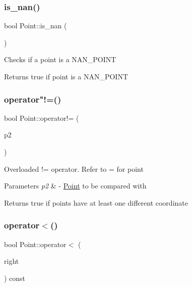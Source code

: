 \subsubsection{\texorpdfstring{is\+\_\+nan()}{is\_nan()}}
{\footnotesize\ttfamily bool Point\+::is\+\_\+nan (\begin{DoxyParamCaption}{ }\end{DoxyParamCaption})}

Checks if a point is a N\+A\+N\+\_\+\+P\+O\+I\+NT \begin{DoxyReturn}{Returns}
true if point is a N\+A\+N\+\_\+\+P\+O\+I\+NT 
\end{DoxyReturn}
\mbox{\label{classPoint_ade5f3908ec0e412aea8c3e12f5d0e26f}} 
\subsubsection{\texorpdfstring{operator"!=()}{operator!=()}}
{\footnotesize\ttfamily bool Point\+::operator!= (\begin{DoxyParamCaption}\item[{const \hyperlink{classPoint}{Point} \&}]{p2 }\end{DoxyParamCaption})}

Overloaded != operator. Refer to = for point 
\begin{DoxyParams}{Parameters}
{\em p2} & -\/ \hyperlink{classPoint}{Point} to be compared with \\
\hline
\end{DoxyParams}
\begin{DoxyReturn}{Returns}
true if points have at least one different coordinate 
\end{DoxyReturn}
\mbox{\label{classPoint_a2d285a505e84d64a96974d5247e8ae7a}} 
\subsubsection{\texorpdfstring{operator$<$()}{operator<()}}
{\footnotesize\ttfamily bool Point\+::operator$<$ (\begin{DoxyParamCaption}\item[{const \hyperlink{classPoint}{Point} \&}]{right }\end{DoxyParamCaption}) const}

